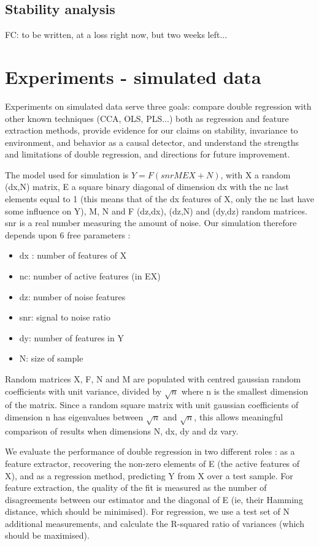 \documentclass{article}
\begin{document}
\subsection{Stability analysis}
FC: to be written, at a loss right now, but two weeks left...

\section{Experiments - simulated data}
Experiments on simulated data serve three goals: compare double regression with other known techniques (CCA, OLS, PLS...) both as regression and feature extraction methods, provide evidence for our claims on stability, invariance to environment, and behavior as a causal detector, and understand the strengths and limitations of double regression, and directions for future improvement.

The model used for simulation is $Y=F(snr MEX+N)$, with X a random (dx,N) matrix, E a square binary diagonal of dimension dx with the nc last elements equal to 1 (this means that of the dx features of X, only the nc last have some influence on Y), M, N and F (dz,dx), (dz,N) and (dy,dz) random matrices. snr is a real number measuring the amount of noise. Our simulation therefore depends upon 6 free parameters : 

\begin{itemize}
\item dx : number of features of X
\item nc: number of active features (in EX)
\item dz: number of noise features
\item snr: signal to noise ratio
\item dy: number of features in Y
\item N: size of sample
\end{itemize}

Random matrices X, F, N and M are populated with centred gaussian random coefficients with unit variance, divided by $ \surd n$ where n is the smallest dimension of the matrix. Since a random square matrix with unit gaussian coefficients of dimension n has eigenvalues between $ \surd n $ and $\surd n $, this allows meaningful comparison of results when dimensions N, dx, dy and dz vary. 

We evaluate the performance of double regression in two different roles : as a feature extractor, recovering the non-zero elements of E (the active features of X), and as a regression method, predicting Y from X over a test sample. For feature extraction, the quality of the fit is measured as the number of disagreements between our estimator and the diagonal of E (ie, their Hamming distance, which should be minimised). For regression, we use a test set of N additional measurements, and calculate the R-squared ratio of variances (which should be maximised).
\end{document}
